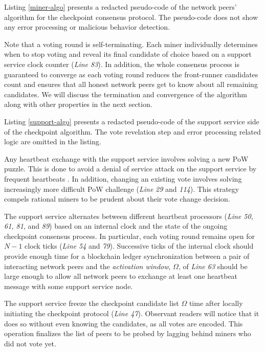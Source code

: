 Listing \ref{miner-algo} presents a redacted pseudo-code of the network peers' algorithm for the checkpoint consensus protocol. The pseudo-code does not show any error processing or malicious behavior detection.

\lstset{caption=A miner's perspective of the checkpoint protocol, label=miner-algo}
 

Note that a voting round is self-terminating. Each miner individually determines when to stop voting and reveal its final candidate of choice based on a support service clock counter (\textit{Line 83}). In addition, the whole consensus process is guaranteed to converge as each voting round reduces the front-runner candidates count and ensures that all honest network peers get to know about all remaining candidates. We will discuss the termination and convergence of the algorithm along with other properties in the next section.

Listing \ref{support-algo} presents a redacted pseudo-code of the support service side of the checkpoint algorithm. The vote revelation step and error processing related logic are omitted in the listing.

\lstset{caption=Support service's perspective of the checkpoint protocol, label=support-algo}


Any heartbeat exchange with the support service involves solving a new PoW puzzle. This is done to avoid a denial of service attack on the support service by frequent heartbeats \cite{Back02hashcash}. In addition, changing an existing vote involves solving increasingly more difficult PoW challenge (\textit{Line} \textit{29} and \textit{114}). This strategy compels rational miners to be prudent about their vote change decision. 

The support service alternates between different heartbeat processors (\textit{Line 50, 61, 81}, and \textit{89}) based on an internal clock and the state of the ongoing checkpoint consensus process. In particular, each voting round remains open for $N - 1$ clock ticks (\textit{Line 54} and \textit{79}). Successive ticks of the internal clock should provide enough time for a blockchain ledger synchronization between a pair of interacting network peers and the \textit{activation window}, $\Omega$, of \textit{Line 63} should be large enough to allow all network peers to exchange at least one heartbeat message with some support service node.

The support service freeze the checkpoint candidate list $\Omega$ time after locally initiating the checkpoint protocol (\textit{Line 47}). Observant readers will notice that it does so without even knowing the candidates, as all votes are encoded. This operation finalizes the list of peers to be probed by lagging behind miners who did not vote yet.    
        

